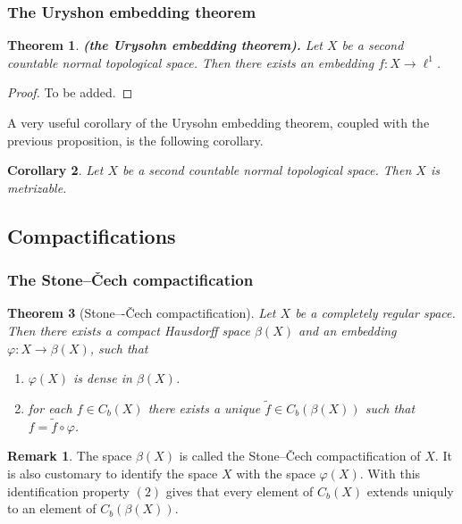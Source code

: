 \documentclass[11pt,a4paper]{article}
\theoremstyle{definition}
\newtheorem{remark}{Remark}[section]
\theoremstyle{plain}
\newtheorem{theorem}{Theorem}[section]
\newtheorem{corollary}[theorem]{Corollary}
\renewcommand{\tt}[1]{\textnormal{\textbf{(#1).}}} %
\begin{document}
  \subsubsection{The Uryshon embedding theorem}

  \begin{theorem}\tt{the Urysohn embedding theorem}
    Let $X$ be a second countable normal topological space.
    Then there exists an embedding $f \colon X \to \ell^1$.
  \end{theorem}
  \begin{proof}
    To be added.
  \end{proof}

  A very useful corollary of the Urysohn embedding theorem, coupled with
  the previous proposition, is the following corollary.

  \begin{corollary}
    Let $X$ be a second countable normal topological space.
    Then $X$ is metrizable.
  \end{corollary}

  \subsection{Compactifications}

  \subsubsection{The Stone--\v{C}ech compactification}

  \begin{theorem}[Stone–-\v{C}ech compactification]
    Let $X$ be a completely regular space.
    Then there exists a compact Hausdorff space $\beta(X)$ and an embedding
    $\varphi \colon X \to \beta(X)$, such that
    \begin{enumerate}
      \item[(1)] $\varphi(X)$ is dense in $\beta(X)$.
      \item[(2)] for each $f \in C_b(X)$ there exists a unique 
        $\tilde f \in C_b(\beta(X))$ such that $f = \tilde f \circ \varphi$.
    \end{enumerate}
  \end{theorem}

  \begin{remark}
    The space $\beta(X)$ is called the Stone--\v{C}ech compactification of
    $X$. It is also customary to identify the space $X$ with the space
    $\varphi(X)$. With this identification property $(2)$ gives that
    every element of $C_b(X)$ extends uniquly to an element of $C_b(\beta(X))$.
  \end{remark}
\end{document}
